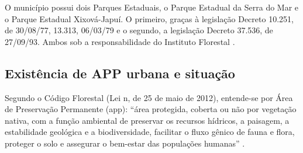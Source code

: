 	O  município possui dois Parques Estaduais, o Parque Estadual da Serra do Mar e o Parque Estadual Xixová-Japuí. O primeiro, graças à legislação Decreto 10.251, de 30/08/77, 13.313, 06/03/79 e o segundo, a legislação Decreto 37.536, de 27/09/93. Ambos sob a responsabilidade do Instituto Florestal \cite{florestal2017a}.
	
	\subsection{Existência de APP urbana e situação}
	
	Segundo o Código Florestal (Lei n, de 25 de maio de 2012), entende-se por Área de Preservação Permanente (\gls{app}): ``área protegida, coberta ou não por vegetação nativa, com a função ambiental de preservar os recursos hídricos, a paisagem, a estabilidade geológica e a biodiversidade, facilitar o fluxo gênico de fauna e flora, proteger o solo e assegurar o bem-estar das populações humanas'' \cite[Art. 3\textordmasculine, alínea II]{gf2012b}.
	

